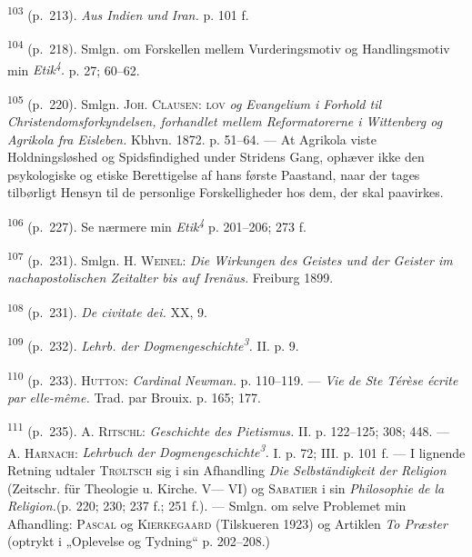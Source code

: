 \documentclass[12pt,a4paper,openany]{book}
\begin{document}
\begin{small}
\textsuperscript{103} (p.~213). \textit{Aus Indien und Iran.} p. 101 f.

\textsuperscript{104} (p.~218). Smlgn. om Forskellen mellem
Vurderingsmotiv og Handlingsmotiv min
\textit{Etik\textsuperscript{4}.} p. 27; 60--62.

\textsuperscript{105} (p.~220). Smlgn. \textsc{Joh. Clausen: lov}
\textit{og Evangelium i Forhold til
Christendomsforkyndelsen, forhandlet mellem Reformatorerne i Wittenberg
og Agrikola fra Eisleben.} Kbhvn. 1872. p. 51--64. --- At Agrikola viste
Holdningsløshed og Spidsfindighed under Stridens Gang, ophæver ikke den
psykologiske og etiske Berettigelse af hans første Paastand, naar der
tages tilbørligt Hensyn til de personlige Forskelligheder hos dem, der
skal paavirkes.

\textsuperscript{106} (p.~227). Se nærmere min
\textit{Etik\textsuperscript{4}} p. 201--206; 273 f.

\textsuperscript{107} (p.~231). Smlgn. H. \textsc{Weinel}: \textit{Die
Wirkungen des Geistes und der
Geister im nachapostolischen Zeitalter bis auf Irenäus.} Freiburg 1899.

\textsuperscript{108} (p.~231). \textit{De civitate dei.} XX, 9.

\textsuperscript{109} (p.~232). \textit{Lehrb. der
Dogmengeschichte\textsuperscript{3}.} II. p. 9.

\textsuperscript{110} (p.~233). \textsc{Hutton}: \textit{Cardinal
Newman.} p. 110--119. --- \textit{Vie
de Ste Térèse écrite par elle-même.} Trad. par Brouix. p. 165; 177.

\textsuperscript{111} (p.~235). A. \textsc{Ritschl}: \textit{Geschichte
des Pietismus.} II. p. 122--125;
308; 448. --- A. \textsc{Harnach}: \textit{Lehrbuch der
Dogmengeschichte\textsuperscript{3}.} I. p. 72; III. p. 101 f. --- I
lignende Retning udtaler \textsc{Trøltsch} sig i sin Afhandling
\textit{Die Selbständigkeit der Religion} (Zeitschr. für Theologie u.
Kirche. V--- VI) og \textsc{Sabatier} i sin \textit{Philosophie de la
Religion.}(p. 220; 230; 237 f.; 251 f.). --- Smlgn. om selve Problemet
min Afhandling: \textsc{Pascal} og \textsc{Kierkegaard} (Tilskueren
1923) og Artiklen \textit{To Præster} (optrykt i „Oplevelse og Tydning“
p. 202--208.)

\end{small}
\end{document}
